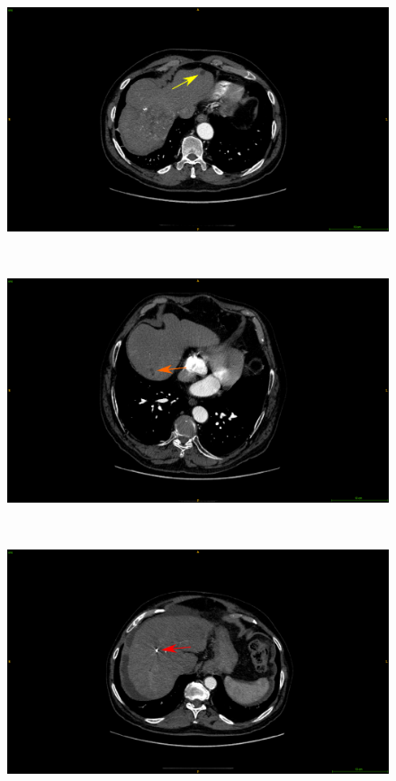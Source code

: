 \documentclass[]{article}
\begin{document}
\begin{figure}[!ht]
	\centering
	\begin{minipage}{0.45\linewidth}
		\includegraphics[width=\linewidth]{../Contributions/images/Artifacts/ResizeGDB_cyst}
	\end{minipage} \\
	\begin{minipage}{0.45\linewidth}
		\includegraphics[width=\linewidth]{../Contributions/images/Artifacts/ResizeGDB_fat}
	\end{minipage} \\
	\begin{minipage}{0.45\linewidth}
		\includegraphics[width=\linewidth]{../Contributions/images/Artifacts/ResizeGDB_metallic_artifacts}

\end{minipage}
\end{figure}
\end{document}
